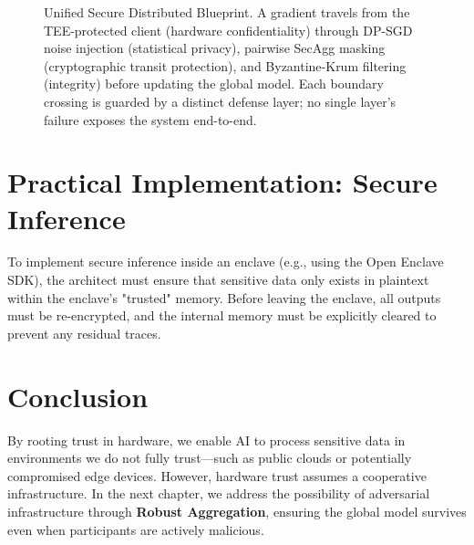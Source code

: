 \begin{figure}[ht]
\caption{Unified Secure Distributed Blueprint. A gradient travels from the TEE-protected client (hardware confidentiality) through DP-SGD noise injection (statistical privacy), pairwise SecAgg masking (cryptographic transit protection), and Byzantine-Krum filtering (integrity) before updating the global model. Each boundary crossing is guarded by a distinct defense layer; no single layer's failure exposes the system end-to-end.}
\label{fig:unified_blueprint}
\end{figure}

\section{Practical Implementation: Secure Inference}
\label{sec:tee_implementation}

To implement secure inference inside an enclave (e.g., using the Open Enclave SDK), the architect must ensure that sensitive data only exists in plaintext within the enclave's "trusted" memory. Before leaving the enclave, all outputs must be re-encrypted, and the internal memory must be explicitly cleared to prevent any residual traces.

\section{Conclusion}
\label{sec:conclusion_tees}

By rooting trust in hardware, we enable AI to process sensitive data in environments we do not fully trust---such as public clouds or potentially compromised edge devices. However, hardware trust assumes a cooperative infrastructure. In the next chapter, we address the possibility of adversarial infrastructure through \textbf{Robust Aggregation}, ensuring the global model survives even when participants are actively malicious.


